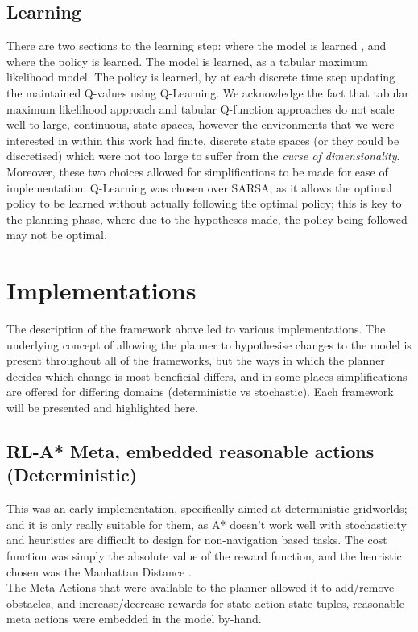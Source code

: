 \subsection{Learning}
There are two sections to the learning step: where the model is learned \cite{10.1145/122344.122377}, and  where the policy is learned. The model is learned, as a tabular maximum likelihood model. The policy is learned, by at each discrete time step  updating the maintained Q-values using Q-Learning.
We acknowledge the fact that tabular maximum likelihood approach and tabular Q-function approaches do not scale well to large, continuous, state spaces, however the environments that we were interested in within this work had finite, discrete state spaces (or they could be discretised) which were not too large to suffer from the \textit{curse of dimensionality}. Moreover, these two choices allowed for simplifications to be made for ease of implementation. Q-Learning was chosen over SARSA, as it allows the optimal policy to be learned without actually following the optimal policy; this is key to the planning phase, where due to the hypotheses made, the policy being followed may not be optimal.
\section{Implementations}
The description of the framework above led to various implementations. The underlying concept of allowing the planner to hypothesise changes to the model is present throughout all of the frameworks, but the ways in which the planner decides which change is most beneficial differs, and in some places simplifications are offered for differing domains (deterministic vs stochastic). Each framework will be presented and highlighted here.
\subsection{RL-A* Meta, embedded reasonable actions (Deterministic)}
This was an early implementation, specifically aimed at deterministic gridworlds; and it is only really suitable for them, as A* doesn't work well with stochasticity and heuristics are difficult to design for non-navigation based tasks. The cost function was simply the absolute value of the reward function, and the heuristic chosen was the Manhattan Distance \cite{krause1973taxicab}.
\\The Meta Actions that were available to the planner allowed it to add/remove obstacles, and increase/decrease rewards for state-action-state tuples, reasonable meta actions were embedded in the model by-hand.

